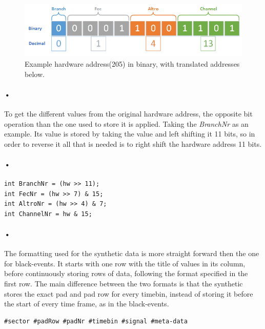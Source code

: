 \documentclass[a4paper, 12pt]{report}\dfrac{\right }{•}
\begin{document}
\begin{figure}[h!]
	\centering
		\includegraphics[width=1.0\textwidth]{images/hw-binary.png}
		\caption{Example hardware address(205) in binary, with translated addresses below.}
		\label{fig:hw-binary}
\end{figure}

\paragraph{•}
To get the different values from the original hardware address, the opposite bit operation than the one used to store it is applied.
Taking the \textit{BranchNr} as an example.
Its value is stored by taking the value and left shifting it 11 bits, so in order to reverse it all that is needed is to right shift the hardware address 11 bits.
\paragraph{•}
\begin{minipage}{\linewidth}
\begin{lstlisting}[caption=Bitwise operation to retrieve values from the hardware address., label=lst:bit-operation]
int BranchNr = (hw >> 11);
int FecNr = (hw >> 7) & 15;
int AltroNr = (hw >> 4) & 7;
int ChannelNr = hw & 15;
\end{lstlisting}
\end{minipage}

\paragraph{•}
The formatting used for the synthetic data is more straight forward then the one for black-events.
It starts with one row with the title of values in its column, before continuously storing rows of data, following the format specified in the first row.
The main difference between the two formats is that the synthetic stores the exact pad and pad row for every timebin, instead of storing it before the start of every time frame, as in the black-events.

\begin{lstlisting}[caption=Format for the synthetic dataset., label=lst:synthetic-data-format]
#sector #padRow #padNr #timebin #signal #meta-data
\end{lstlisting}
\end{document}
